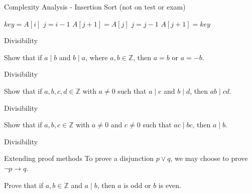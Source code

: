 \documentclass{beamer}
\renewcommand{\implies}{\rightarrow}
\begin{document}
\begin{frame}{Complexity Analysis - Insertion Sort (not on test or exam)}
    \begin{example}
        \begin{algorithm}[H]
            \caption{Insertion-Sort($A$, $n$)}
            \begin{algorithmic}[1]
                      \STATE $key = A[i]$
                      \STATE $j = i - 1$
                        \STATE $A[j+1] = A[j]$
                        \STATE $j = j -1$
                      \ENDWHILE
                      \STATE $A[j+1] = key$
                \ENDFOR
            \end{algorithmic}
        \end{algorithm}
        \vspace{2mm}
    \end{example}
\end{frame}

\begin{frame}[t]{Divisibility}
    \begin{example}
        Show that if $a \mid b$ and $b \mid a$, where $a,b \in \mathbb{Z}$, then $a = b$ or $a = -b$. 
    \end{example}
\end{frame}

\begin{frame}[t]{Divisibility}
    \begin{example}
        Show that if $a,b,c,d \in \mathbb{Z}$ with $a \neq 0$ such that $a \mid c$ and $b \mid d$, then $ab \mid cd$. 
    \end{example}
\end{frame}

\begin{frame}[t]{Divisibility}
    \begin{example}
        Show that if $a,b,c \in \mathbb{Z}$ with $a \neq 0$ and $c \neq 0$ such that $ac \mid bc$, then $a \mid b$.
    \end{example}
\end{frame}

\begin{frame}[t]{Divisibility}
    \begin{block}{Extending proof methods}
        To prove a disjunction $p \vee q$, we may choose to prove $\neg p \implies q$.
    \end{block}
    \begin{example}
        Prove that if $a,b \in \mathbb{Z}$ and $a \mid b$, then $a$ is odd or $b$ is even. 
    \end{example}
\end{frame}
\end{document}
